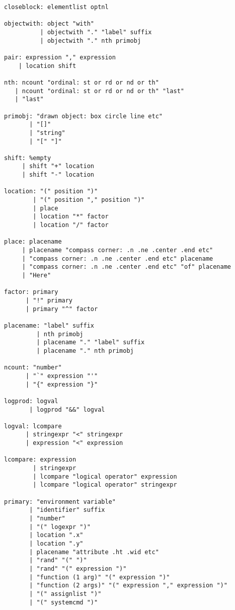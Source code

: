 \documentclass[11pt]{article}
\begin{document}
\begin{verbatim}
closeblock: elementlist optnl

objectwith: object "with"
          | objectwith "." "label" suffix
          | objectwith "." nth primobj

pair: expression "," expression
    | location shift

nth: ncount "ordinal: st or rd or nd or th"
   | ncount "ordinal: st or rd or nd or th" "last"
   | "last"

primobj: "drawn object: box circle line etc"
       | "[]"
       | "string"
       | "[" "]"

shift: %empty
     | shift "+" location
     | shift "-" location

location: "(" position ")"
        | "(" position "," position ")"
        | place
        | location "*" factor
        | location "/" factor

place: placename
     | placename "compass corner: .n .ne .center .end etc"
     | "compass corner: .n .ne .center .end etc" placename
     | "compass corner: .n .ne .center .end etc" "of" placename
     | "Here"

factor: primary
      | "!" primary
      | primary "^" factor

placename: "label" suffix
         | nth primobj
         | placename "." "label" suffix
         | placename "." nth primobj

ncount: "number"
      | "`" expression "'"
      | "{" expression "}"

logprod: logval
       | logprod "&&" logval

logval: lcompare
      | stringexpr "<" stringexpr
      | expression "<" expression

lcompare: expression
        | stringexpr
        | lcompare "logical operator" expression
        | lcompare "logical operator" stringexpr

primary: "environment variable"
       | "identifier" suffix
       | "number"
       | "(" logexpr ")"
       | location ".x"
       | location ".y"
       | placename "attribute .ht .wid etc"
       | "rand" "(" ")"
       | "rand" "(" expression ")"
       | "function (1 arg)" "(" expression ")"
       | "function (2 args)" "(" expression "," expression ")"
       | "(" assignlist ")"
       | "(" systemcmd ")"
\end{verbatim}
\end{document}
